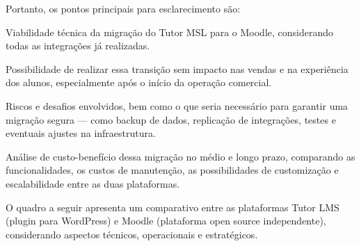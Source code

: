 \documentclass[12pt, a4paper]{letter} %
\begin{document}
Portanto, os pontos principais para esclarecimento são:

Viabilidade técnica da migração do Tutor MSL para o Moodle, considerando todas as integrações já realizadas.

Possibilidade de realizar essa transição sem impacto nas vendas e na experiência dos alunos, especialmente após o início da operação comercial.

Riscos e desafios envolvidos, bem como o que seria necessário para garantir uma migração segura — como backup de dados, replicação de integrações, testes e eventuais ajustes na infraestrutura.

Análise de custo-benefício dessa migração no médio e longo prazo, comparando as funcionalidades, os custos de manutenção, as possibilidades de customização e escalabilidade entre as duas plataformas.




\clearpage

O quadro a seguir apresenta um comparativo entre as plataformas Tutor LMS (plugin para WordPress) e Moodle (plataforma open source independente), considerando aspectos técnicos, operacionais e estratégicos.
\end{document}
